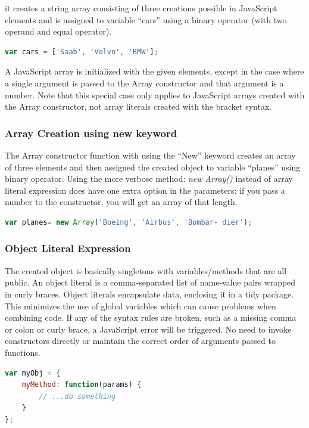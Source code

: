 it creates a string array consisting of three creations possible in JavaScript elements and is assigned to variable “cars” using a binary operator (with two operand and equal operator). 
\medskip
\begin{lstlisting}[caption={Array literal expression},label={lst:array_literal},language=JavaScript]
var cars = ['Saab', 'Volvo', 'BMW'];
\end{lstlisting}
A JavaScript array is initialized with the given elements, except in the case where a single argument is passed to the Array constructor and that argument is a number. Note that this special case only applies to JavaScript arrays created with the Array constructor, not array literals created with the bracket syntax.
\\
\noindent\subsubsection{Array Creation using \textbf{new} keyword}

The Array constructor function with using the “New” keyword creates an array of three elements and then assigned the created object to variable “planes” using binary operator. Using the more verbose method: \textit{new Array()} instead of array literal expression does have one extra option in the parameters: if you pass a number to the constructor, you will get an array of that length. 

\medskip
\begin{lstlisting}[caption={Array constructor},label={lst:array_constructor},language=JavaScript]
var planes= new Array('Boeing', 'Airbus', 'Bombar- dier');
\end{lstlisting}

\noindent\subsubsection{Object Literal Expression}


The created object is basically singletons with variables/methods that are all public. An object literal is a comma-separated list of name-value pairs wrapped in curly braces. Object literals encapsulate data, enclosing it in a tidy package. This minimizes the use of global variables which can cause problems when combining code. If any of the syntax rules are broken, such as a missing comma or colon or curly brace, a JavaScript error will be triggered. No need to invoke constructors directly or maintain the correct order of arguments passed to functions.
\begin{lstlisting}[caption={Object literal expression},label={lst:object_literal_expression},language=JavaScript] 
var myObj = {
	myMethod: function(params) {
		// ...do something
	}
};
\end{lstlisting}

